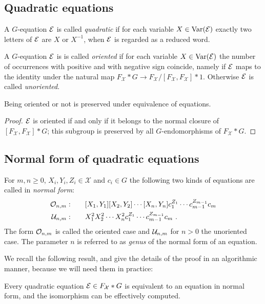 \documentclass[a4paper,11pt]{amsart}
\begin{document}
\subsection{Quadratic equations}
A $G$-equation $\mathcal{E}$ is called \emph{quadratic} if for each variable
$X\in \textup{Var}(\mathcal{E})$ exactly two letters of $\mathcal{E}$ are $X$ or $X^{-1}$, when
$\mathcal{E}$ is regarded as a reduced word.

A $G$-equation $\mathcal{E}$ is is called \emph{oriented} if for each variable
$X\in \textup{Var}(\mathcal{E})$ the number of occurrences with positive and with
negative sign coincide, namely if $\mathcal{E}$ maps to the identity under the
natural map $F_{\mathcal{X}}*G\to F_{\mathcal{X}}/[F_{\mathcal{X}},F_{\mathcal{X}}]*1$. 
Otherwise $\mathcal{E}$ is called \emph{unoriented}.
\begin{lem}
 Being oriented or not is preserved under equivalence of equations.
\end{lem}
\begin{proof}
  $\mathcal{E}$ is oriented if and only if it belongs to the normal closure of
  $[F_{\mathcal{X}},F_{\mathcal{X}}]*G$; this subgroup is preserved by all $G$-endomorphisms
  of $F_{\mathcal{X}}*G$.
\end{proof}

\subsection{Normal form of quadratic equations} \label{sec:normal_form}
\begin{defi}
  For $m,n\ge0$, $X_i,Y_i,Z_i \in\mathcal{X}$ and $c_i \in G$ the following two kinds of
  equations are called in \emph{normal form}:
 \begin{align}
  \mathcal{O}_{n,m}:\qquad & [X_1,Y_1][X_2,Y_2]\cdots[X_n,Y_n]c_1^{Z_1}\cdots c_{m-1}^{Z_{m-1}}c_m  \\
   \mathcal{U}_{n,m}:\qquad & X_1^2X_2^2\cdots X_n^2 c_1^{Z_1}\cdots c_{m-1}^{Z_{m-1}}c_m\ .
 \end{align} 
 The form $\mathcal{O}_{n,m}$ is called the oriented case and $\mathcal{U}_{n,m}$ for
 $n>0$ the unoriented case.  The parameter $n$ is referred to as
 \emph{genus} of the normal form of an equation.
\end{defi}

We recall the following result, and give the details of the proof in
an algorithmic manner, because we will need them in practice:
\begin{thm} \label{Thm:equationNormalForm}
  Every quadratic equation $\mathcal{E} \in F_{\mathcal{X}}*G$ is equivalent to an equation
  in normal form, and the isomorphism can be effectively computed.
\end{thm}
\end{document}
